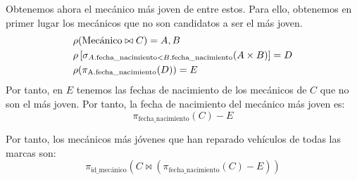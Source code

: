 \begin{ejercicio}
\begin{enumerate}
        Obtenemos ahora el mecánico más joven de entre estos. Para ello,
        obtenemos en primer lugar los mecánicos que no son candidatos a ser el más joven.
        \begin{align*}
            & \rho(\text{Mecánico}\bowtie C) = A,B\\
            & \rho\left[\sigma_{A.\text{fecha\_nacimiento} < B.\text{fecha\_nacimiento}}(A \times B)\right] = D\\
            & \rho(\pi_{\text{A.\text{fecha\_nacimiento}}}(D)) = E
        \end{align*}
        Por tanto, en $E$ tenemos las fechas de nacimiento de los mecánicos de $C$ que no son el más joven.
        Por tanto, la fecha de nacimiento del mecánico más joven es:
        \begin{equation*}
            \pi_{\text{fecha\_nacimiento}}(C)-E
        \end{equation*}

        Por tanto, los mecánicos más jóvenes que han reparado vehículos de todas las marcas son:
        \begin{equation*}
            \pi_{\text{id\_mecánico}}(C\bowtie (\pi_{\text{fecha\_nacimiento}}(C)-E))
        \end{equation*}

    \end{enumerate}

\end{ejercicio}




